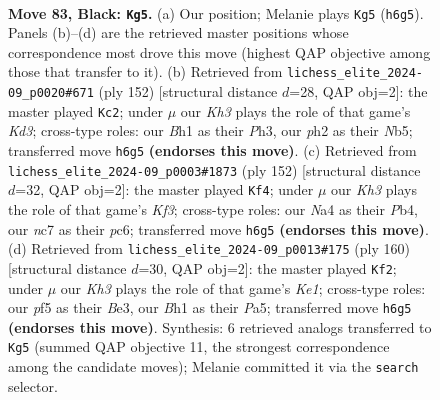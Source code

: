 \documentclass[11pt]{article}
\begin{document}
\clearpage

\begin{figure}[p]\centering
\begin{subfigure}{0.46\textwidth}\centering
\resizebox{\linewidth}{!}{%
\newchessgame
\chessboard[
  setfen={8/P1NR4/7k/5P2/np4P1/7B/5K1P/7b b - - 0 83},
  showmover=false,
  pgfstyle=straightmove, color=movearrow, markmove={h6-g5}
]}
\caption{}
\end{subfigure}\hfill
\begin{subfigure}{0.46\textwidth}\centering
\resizebox{\linewidth}{!}{%
\newchessgame
\chessboard[
  setfen={8/5p2/6p1/1N1kp1Bp/8/3K3P/1b4P1/8 w - - 18 77},
  showmover=false,
  pgfstyle=straightmove, color=movearrow, markmove={d3-c2}
]}
\caption{}
\end{subfigure}
\\[4pt]
\begin{subfigure}{0.46\textwidth}\centering
\resizebox{\linewidth}{!}{%
\newchessgame
\chessboard[
  setfen={8/3bk3/2p3Bp/1p1p4/1P1P3P/5K2/8/8 w - - 12 77},
  showmover=false,
  pgfstyle=straightmove, color=movearrow, markmove={f3-f4}
]}
\caption{}
\end{subfigure}\hfill
\begin{subfigure}{0.46\textwidth}\centering
\resizebox{\linewidth}{!}{%
\newchessgame
\chessboard[
  setfen={8/8/p2k4/P2b3p/7P/4Bp2/8/4K3 w - - 60 81},
  showmover=false,
  pgfstyle=straightmove, color=movearrow, markmove={e1-f2}
]}
\caption{}
\end{subfigure}
\caption{\textbf{Move 83, Black: \texttt{Kg5}.} (a) Our position; Melanie plays \texttt{Kg5} (\texttt{h6g5}). Panels (b)--(d) are the retrieved master positions whose correspondence most drove this move (highest QAP objective among those that transfer to it). (b) Retrieved from \texttt{lichess\_elite\_2024-09\_p0020\#671} (ply 152) [structural distance $d$=28, QAP obj=2]: the master played \texttt{Kc2}; under $\mu$ our \emph{Kh3} plays the role of that game's \emph{Kd3}; cross-type roles: our \emph{B}h1 as their \emph{P}h3, our \emph{p}h2 as their \emph{N}b5; transferred move \texttt{h6g5} \textbf{(endorses this move)}. (c) Retrieved from \texttt{lichess\_elite\_2024-09\_p0003\#1873} (ply 152) [structural distance $d$=32, QAP obj=2]: the master played \texttt{Kf4}; under $\mu$ our \emph{Kh3} plays the role of that game's \emph{Kf3}; cross-type roles: our \emph{N}a4 as their \emph{P}b4, our \emph{n}c7 as their \emph{p}c6; transferred move \texttt{h6g5} \textbf{(endorses this move)}. (d) Retrieved from \texttt{lichess\_elite\_2024-09\_p0013\#175} (ply 160) [structural distance $d$=30, QAP obj=2]: the master played \texttt{Kf2}; under $\mu$ our \emph{Kh3} plays the role of that game's \emph{Ke1}; cross-type roles: our \emph{p}f5 as their \emph{B}e3, our \emph{B}h1 as their \emph{P}a5; transferred move \texttt{h6g5} \textbf{(endorses this move)}. Synthesis: 6 retrieved analogs transferred to \texttt{Kg5} (summed QAP objective 11, the strongest correspondence among the candidate moves); Melanie committed it via the \texttt{search} selector.}
\label{fig:thought-m165}
\end{figure}
\end{document}
